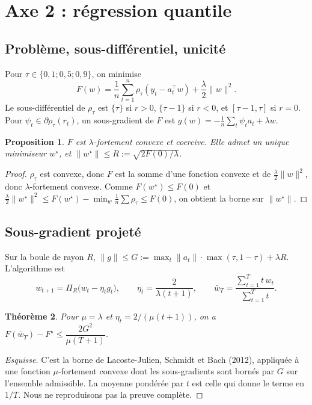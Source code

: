 \documentclass[11pt,a4paper]{article}
\newtheorem{theorem}{Théorème}[section]
\newtheorem{proposition}[theorem]{Proposition}
\theoremstyle{remark}
\theoremstyle{definition}
\newcommand{\pinball}{\rho_\tau}
\newcommand{\T}{^{\top}}
\begin{document}
\section{Axe 2 : régression quantile}\label{sec:ax2}
\subsection{Problème, sous-différentiel, unicité}
Pour $\tau \in \{0{,}1 ; 0{,}5 ; 0{,}9\}$, on minimise
\begin{equation}\label{eq:quant}
F(w) = \frac1n\sum_{t=1}^n \pinball(y_t - a_t\T w) + \frac\lambda2\|w\|^2.
\end{equation}
Le sous-différentiel de $\pinball$ est $\{\tau\}$ si $r>0$, $\{\tau-1\}$ si $r<0$, et $[\tau-1,\tau]$ si $r=0$.
Pour $\psi_t \in \partial\pinball(r_t)$, un sous-gradient de $F$ est $g(w) = -\frac1n\sum_t \psi_t a_t + \lambda w$.

\begin{proposition}\label{prop:quant}
$F$ est $\lambda$-fortement convexe et coercive. Elle admet un unique minimiseur $w^\star$, et $\|w^\star\| \le R := \sqrt{2F(0)/\lambda}$.
\end{proposition}
\begin{proof}
$\pinball$ est convexe, donc $F$ est la somme d'une fonction convexe et de $\frac\lambda2\|w\|^2$, donc $\lambda$-fortement convexe.
Comme $F(w^\star) \le F(0)$ et $\frac\lambda2\|w^\star\|^2 \le F(w^\star) - \min_w \frac1n\sum\pinball \le F(0)$, on obtient la borne sur $\|w^\star\|$.
\end{proof}

\subsection{Sous-gradient projeté}
Sur la boule de rayon $R$, $\|g\| \le G := \max_t\|a_t\|\cdot\max(\tau,1-\tau) + \lambda R$. L'algorithme est
\[
w_{t+1} = \Pi_R\bigl(w_t - \eta_t g_t\bigr), \qquad \eta_t = \frac{2}{\lambda(t+1)}, \qquad \bar w_T = \frac{\sum_{t=1}^T t\,w_t}{\sum_{t=1}^T t}.
\]
\begin{theorem}\label{thm:subgrad}
Pour $\mu = \lambda$ et $\eta_t = 2/(\mu(t+1))$, on a $F(\bar w_T) - F^\star \le \dfrac{2G^2}{\mu(T+1)}$.
\end{theorem}
\begin{proof}[Esquisse]
C'est la borne de Lacoste-Julien, Schmidt et Bach (2012), appliquée à une fonction $\mu$-fortement convexe dont les sous-gradients sont bornés par $G$ sur l'ensemble admissible.
La moyenne pondérée par $t$ est celle qui donne le terme en $1/T$. Nous ne reproduisons pas la preuve complète.
\end{proof}
\end{document}
